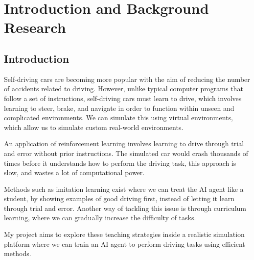 \chapter{Introduction and Background Research}

\label{chapter1}

\section{Introduction}

Self-driving cars are becoming more popular with the aim of reducing the number of accidents related to driving. However, unlike typical computer programs that follow a set of instructions, self-driving cars must learn to drive, which involves learning to steer, brake, and navigate in order to function within unseen and complicated environments. We can simulate this using virtual environments, which allow us to simulate custom real-world environments.

An application of reinforcement learning involves learning to drive through trial and error without prior instructions. The simulated car would crash thousands of times before it understands how to perform the driving task, this approach is slow, and wastes a lot of computational power.

Methods such as imitation learning exist where we can treat the AI agent like a student, by showing examples of good driving first, instead of letting it learn through trial and error. Another way of tackling this issue is through curriculum learning, where we can gradually increase the difficulty of tasks.

My project aims to explore these teaching strategies inside a realistic simulation platform where we can train an AI agent to perform driving tasks using efficient methods.

